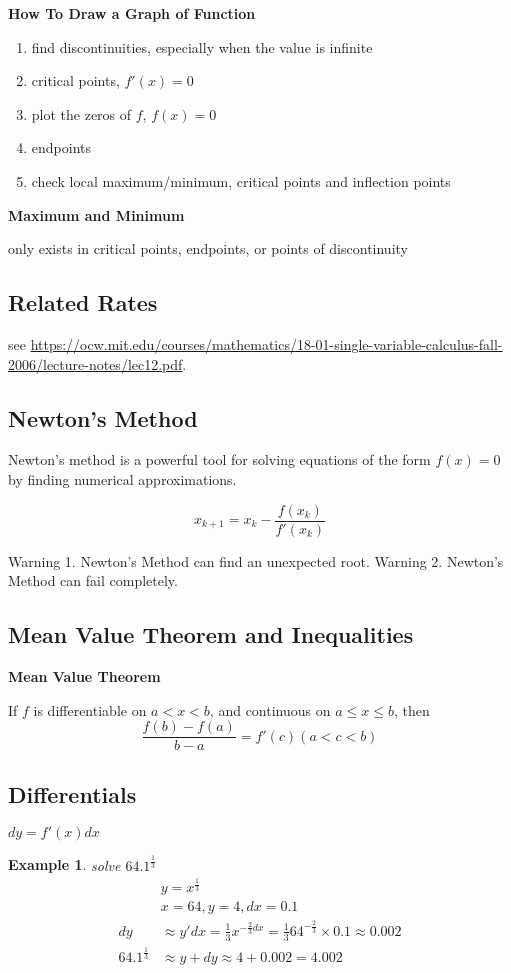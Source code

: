 \documentclass{article}
\newtheorem{exmp}{Example}
\begin{document}
\textbf{How To Draw a Graph of Function}
\begin{enumerate}
  \item find discontinuities, especially when the value is infinite
  \item critical points, $f'(x) = 0$
  \item plot the zeros of $f$, $f(x) = 0$
  \item endpoints
  \item check local maximum/minimum, critical points and inflection points
\end{enumerate}

\textbf{Maximum and Minimum}

only exists in critical points, endpoints, or points of discontinuity

\subsection{Related Rates}
see \url{https://ocw.mit.edu/courses/mathematics/18-01-single-variable-calculus-fall-2006/lecture-notes/lec12.pdf}.

\subsection{Newton's Method}
Newton's method is a powerful tool for solving equations of the form $f(x) = 0$ by finding numerical approximations.

$$x_{k+1} = x_k - \frac{f(x_k)}{f'(x_k)}$$

Warning 1. Newton's Method can find an unexpected root.
Warning 2. Newton's Method can fail completely.

\subsection{Mean Value Theorem and Inequalities}
\textbf{Mean Value Theorem}

If $f$ is differentiable on $a < x < b$, and continuous on $a \le x \le b$, then
$$\frac{f(b)-f(a)}{b-a} = f'(c) (a<c<b)$$

\subsection{Differentials}
$dy = f'(x)dx$
\begin{exmp}
  solve $64.1^{\frac{1}{3}}$
  \begin{align*}
    & y = x^{\frac{1}{3}} \\
    & x = 64, y = 4, dx = 0.1 \\
    dy &\approx y'dx = \frac{1}{3}x^{-\frac{2}{3}dx} = \frac{1}{3}64^{-\frac{2}{3}} \times 0.1 \approx 0.002 \\
    64.1^{\frac{1}{3}} &\approx y+dy \approx 4+0.002 = 4.002
  \end{align*}
\end{exmp}
\end{document}
